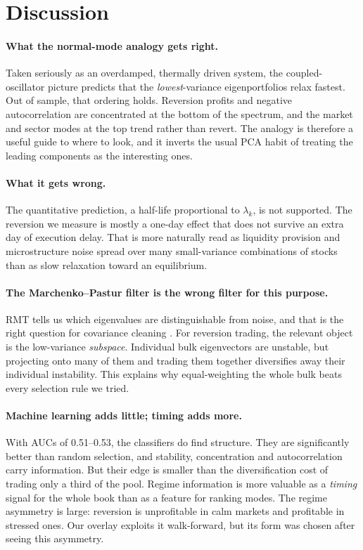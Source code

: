\section{Discussion}
\label{sec:discussion}

\paragraph{What the normal-mode analogy gets right.} Taken seriously as
an overdamped, thermally driven system, the coupled-oscillator picture
predicts that the \emph{lowest}-variance eigenportfolios relax fastest.
Out of sample, that ordering holds. Reversion profits and negative
autocorrelation are concentrated at the bottom of the spectrum, and the
market and sector modes at the top trend rather than revert. The
analogy is therefore a useful guide to where to look, and it inverts
the usual PCA habit of treating the leading components as the
interesting ones.

\paragraph{What it gets wrong.} The quantitative prediction, a half-life
proportional to $\lambda_k$, is not supported. The reversion we
measure is mostly a one-day effect that does not survive an extra day
of execution delay. That is more naturally read as liquidity provision
and microstructure noise \citep{lehmann1990,nagel2012} spread over many
small-variance combinations of stocks than as slow relaxation toward an
equilibrium.

\paragraph{The Marchenko--Pastur filter is the wrong filter for this
purpose.} RMT tells us which eigenvalues are distinguishable from noise,
and that is the right question for covariance cleaning
\citep{laloux1999,bunbouchaud2017}. For reversion trading, the relevant
object is the low-variance \emph{subspace}. Individual bulk eigenvectors
are unstable, but projecting onto many of them and trading them together
diversifies away their individual instability. This explains why
equal-weighting the whole bulk beats every selection rule we tried.

\paragraph{Machine learning adds little; timing adds more.} With AUCs of
0.51--0.53, the classifiers do find structure. They are significantly
better than random selection, and stability, concentration and
autocorrelation carry information. But their edge is smaller than the
diversification cost of trading only a third of the pool. Regime
information is more valuable as a \emph{timing} signal for the whole
book than as a feature for ranking modes. The regime asymmetry is
large: reversion is unprofitable in calm markets and profitable in
stressed ones. Our overlay exploits it walk-forward, but its form was
chosen after seeing this asymmetry.

